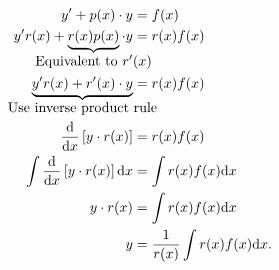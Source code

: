 \documentclass[../notes.tex]{subfiles}
\begin{document}
\begin{align*}
				y' + p( x ) \cdot y &= f( x ) \\
				y'r( x )  + \underbrace{r( x ) p( x )}_{\clap{Equivalent to $r'( x ) $}}  \cdot y &= r( x ) f( x ) \\
				\underbrace{y'r( x ) + r'( x ) \cdot y}_{\clap{Use inverse product rule}}  &= r( x ) f( x ) \\
				\dv{x} \left[ y\cdot r( x ) \right] &= r( x ) f( x ) \\
				\int\dv{x} \left[ y\cdot r( x ) \right] \dd x &= \int r( x ) f( x ) \dd x \\
				y\cdot r( x ) &= \int r( x ) f( x ) \dd x \\
				y &= \frac{1}{r( x )}\int r( x ) f( x ) \dd x
.\end{align*}
\end{document}
